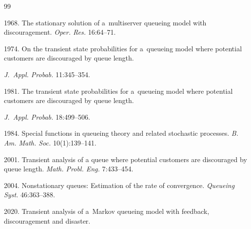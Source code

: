 {\small\frenchspacing

{ %


\begin{thebibliography}{99}




 1968. The stationary solution of a~multiserver queueing model with discouragement. \textit{Oper. Res.} 16:64--71.




 1974. On the transient state probabilities for a~queueing model where potential customers are discouraged by queue length. 

\textit{J.~Appl. Probab.} 11:345--354.




 1981. The transient state probabilities for a~queueing model where potential customers are discouraged by queue length.

\textit{J.~Appl. Probab.} 18:499--506.   





 1984. Special functions in queueing theory and related stochastic processes. \textit{B. Am. Math. Soc.} 10(1):139--141.

 



 2001. Transient analysis of a queue where potential customers are discouraged by queue length. \textit{Math. Probl. Eng.} 7:433--454.

 



 2004. Nonstationary queues: Estimation of the rate of convergence. \textit{Queueing Syst.} 46:363--388.




 2020. Transient analysis of a~Markov queueing model with feedback, discouragement and disaster.


\end{thebibliography}}}
